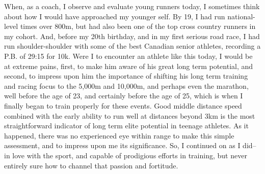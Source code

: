 When, as a coach, I observe and evaluate young runners today, I sometimes think about how I would have approached my younger self. By 19, I had run national-level times over 800m, but had also been one of the top cross country runners in my cohort. And, before my 20th birthday, and in my first serious road race, I had run shoulder-shoulder with some of the best Canadian senior athletes, recording a P.B. of 29:15 for 10k. Were I to encounter an athlete like this today, I would be at extreme pains, first, to make him aware of his great long term potential, and second, to impress upon him the importance of shifting his long term training and racing focus to the 5,000m and 10,000m, and perhaps even the marathon, well before the age of 23, and certainly before the age of 25, which is when I finally began to train properly for these events. Good middle distance speed combined with the early ability to run well at distances beyond 3km is the most straightforward indicator of long term elite potential in teenage athletes. As it happened, there was no experienced eye within range to make this simple assessment, and to impress upon me its significance. So, I continued on as I did-- in love with the sport, and capable of prodigious efforts in training, but never entirely sure how to channel that passion and fortitude.

